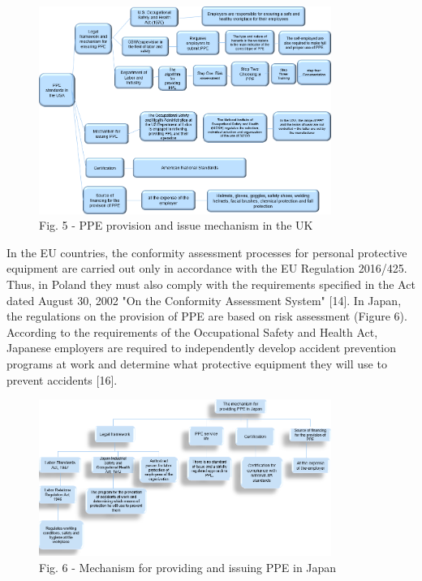 \begin{figure}[H]
	\centering
	\includegraphics[width=0.85\textwidth]{media/chem2/image5}
	\caption*{Fig. 5 - PPE provision and issue mechanism in the UK}
\end{figure}

\begin{multicols}{2}
In the EU countries, the conformity assessment processes for personal
protective equipment are carried out only in accordance with the EU
Regulation 2016/425. Thus, in Poland they must also comply with the
requirements specified in the Act dated August 30, 2002 "On the
Conformity Assessment System" {[}14{]}. In Japan, the regulations on the
provision of PPE are based on risk assessment (Figure 6). According to
the requirements of the Occupational Safety and Health Act, Japanese
employers are required to independently develop accident prevention
programs at work and determine what protective equipment they will use
to prevent accidents {[}16{]}.
\end{multicols}

\begin{figure}[H]
	\centering
	\includegraphics[width=0.85\textwidth]{media/chem2/image6}
	\caption*{Fig. 6 - Mechanism for providing and issuing PPE in Japan}
\end{figure}

